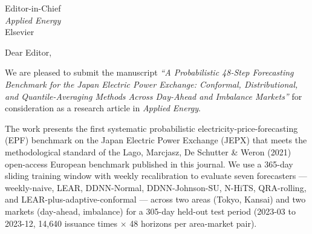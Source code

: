\documentclass[11pt,a4paper]{letter}
\begin{document}
\begin{letter}{Editor-in-Chief \\ \emph{Applied Energy} \\ Elsevier}

\opening{Dear Editor,}

We are pleased to submit the manuscript \emph{``A Probabilistic 48-Step Forecasting Benchmark for the Japan Electric Power Exchange: Conformal, Distributional, and Quantile-Averaging Methods Across Day-Ahead and Imbalance Markets''} for consideration as a research article in \emph{Applied Energy}.

The work presents the first systematic probabilistic electricity-price-forecasting (EPF) benchmark on the Japan Electric Power Exchange (JEPX) that meets the methodological standard of the Lago, Marcjasz, De Schutter \& Weron (2021) open-access European benchmark published in this journal. We use a 365-day sliding training window with weekly recalibration to evaluate seven forecasters --- weekly-naive, LEAR, DDNN-Normal, DDNN-Johnson-SU, N-HiTS, QRA-rolling, and LEAR-plus-adaptive-conformal --- across two areas (Tokyo, Kansai) and two markets (day-ahead, imbalance) for a 305-day held-out test period (2023-03 to 2023-12, 14{,}640 issuance times \(\times\) 48 horizons per area-market pair).


\end{letter}
\end{document}
